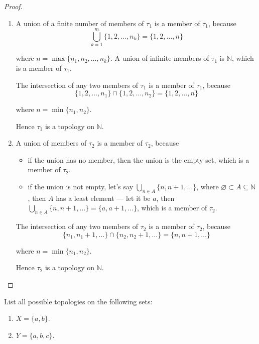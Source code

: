 \begin{proof}
    \begin{enumerate}[label={(\roman*)}]
        \item A union of a finite number of members of $\tau_{1}$ is a member of $\tau_{1}$, because
              \[
                  \bigcup^{m}_{k=1} \{ 1, 2, \ldots, n_{k} \} = \{ 1, 2, \ldots, n \}
              \]

              where $n = \max\{ n_{1}, n_{2}, \ldots, n_{k} \}$. A union of infinite members of $\tau_{1}$ is $\mathbb{N}$, which is a member of $\tau_{1}$.

              The intersection of any two members of $\tau_{1}$ is a member of $\tau_{1}$, because
              \[
                  \{ 1, 2, \ldots, n_{1} \} \cap \{ 1, 2, \ldots, n_{2} \} = \{ 1, 2, \ldots, n \}
              \]

              where $n = \min\{ n_{1}, n_{2} \}$.

              Hence $\tau_{1}$ is a topology on $\mathbb{N}$.
        \item A union of members of $\tau_{2}$ is a member of $\tau_{2}$, because
              \begin{itemize}
                  \item if the union has no member, then the union is the empty set, which is a member of $\tau_{2}$.
                  \item if the union is not empty, let's say $\bigcup_{n\in A} \{ n, n + 1, \ldots \}$, where $\varnothing\subset A\subseteq \mathbb{N}$, then $A$ has a least element --- let it be $a$, then $\bigcup_{n\in A} \{ n, n + 1, \ldots \} = \{ a, a+1, \ldots \}$, which is a member of $\tau_{2}$.
              \end{itemize}

              The intersection of any two members of $\tau_{2}$ is a member of $\tau_{2}$, because
              \[
                  \{ n_{1}, n_{1} + 1, \ldots \}\cap \{ n_{2}, n_{2} + 1, \ldots \} = \{ n, n+1, \ldots \}
              \]

              where $n = \min\{ n_{1}, n_{2} \}$.

              Hence $\tau_{2}$ is a topology on $\mathbb{N}$.
    \end{enumerate}
\end{proof}
\newpage

\begin{exercise}
    List all possible topologies on the following sets:
    \begin{enumerate}[label={(\alph*)}]
        \item $X = \{ a, b \}$.
        \item $Y = \{ a, b, c \}$.
    \end{enumerate}
\end{exercise}

